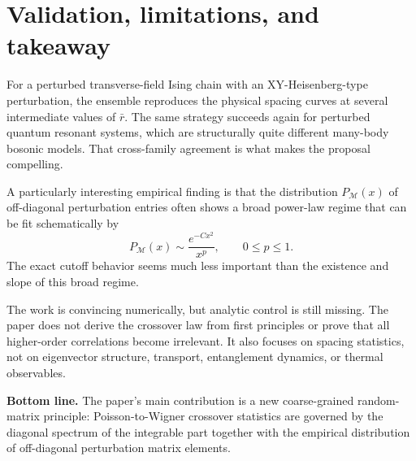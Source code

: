 \documentclass[11pt]{article}
\begin{document}
\section*{Validation, limitations, and takeaway}
For a perturbed transverse-field Ising chain with an XY-Heisenberg-type perturbation, the ensemble reproduces the physical spacing curves at several intermediate values of $\bar r$. The same strategy succeeds again for perturbed quantum resonant systems, which are structurally quite different many-body bosonic models. That cross-family agreement is what makes the proposal compelling.

A particularly interesting empirical finding is that the distribution $P_{\mathcal M}(x)$ of off-diagonal perturbation entries often shows a broad power-law regime that can be fit schematically by
\[
P_{\mathcal M}(x)\sim \frac{e^{-Cx^2}}{x^p}, \qquad 0\le p\le 1.
\]
The exact cutoff behavior seems much less important than the existence and slope of this broad regime.

The work is convincing numerically, but analytic control is still missing. The paper does not derive the crossover law from first principles or prove that all higher-order correlations become irrelevant. It also focuses on spacing statistics, not on eigenvector structure, transport, entanglement dynamics, or thermal observables.

\textbf{Bottom line.} The paper's main contribution is a new coarse-grained random-matrix principle: Poisson-to-Wigner crossover statistics are governed by the diagonal spectrum of the integrable part together with the empirical distribution of off-diagonal perturbation matrix elements.
\end{document}
